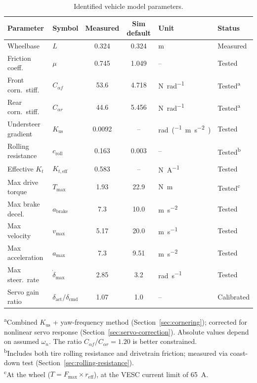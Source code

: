 \documentclass[11pt,a4paper]{article}
\begin{document}
\begin{table}[H]
\centering
\caption{Identified vehicle model parameters.}\label{tab:params}
\begin{tabular}{ll S[table-format=2.3] S[table-format=3.3] l l}
\toprule
{Parameter} & {Symbol} & {Measured} & {Sim default} & {Unit} & {Status} \\
\midrule
Wheelbase             & $L$
  & 0.324  & 0.324  & \si{\metre}
  & Measured \\
Friction coeff.\      & $\mu$
  & 0.745  & 1.049  & {--}
  & Tested \\
Front corn.\ stiff.\  & $C_{\alpha f}$
  & 53.6   & 4.718  & \si{\newton\per\radian}
  & Tested\textsuperscript{a} \\
Rear corn.\ stiff.\   & $C_{\alpha r}$
  & 44.6   & 5.456  & \si{\newton\per\radian}
  & Tested\textsuperscript{a} \\
Understeer gradient   & $K_\text{us}$
  & 0.0092  & {--}   & \si{\radian\per(\metre\per\second\squared)}
  & Tested \\
Rolling resistance   & $c_\text{roll}$
  & 0.163  & 0.003    & {--}
  & Tested\textsuperscript{b} \\
Effective $K_{t}$     & $K_{t,\text{eff}}$
  & 0.583  & {--}   & \si{\newton\per\ampere}
  & Tested \\
Max drive torque      & $T_\text{max}$
  & 1.93   & 22.9   & \si{\newton\metre}
  & Tested\textsuperscript{c} \\
Max brake decel.\     & $a_\text{brake}$
  & 7.3    & 10.0   & \si{\metre\per\second\squared}
  & Tested \\
Max velocity          & $v_\text{max}$
  & 5.17   & 20.0   & \si{\metre\per\second}
  & Tested \\
Max acceleration      & $a_\text{max}$
  & 7.3    & 9.51   & \si{\metre\per\second\squared}
  & Tested \\
Max steer.\ rate      & $\dot{\delta}_\text{max}$
  & 2.85   & 3.2    & \si{\radian\per\second}
  & Tested \\
Servo gain ratio      & $\delta_\text{act}/\delta_\text{cmd}$
  & 1.07   & 1.0    & {--}
  & Calibrated \\
\bottomrule
\end{tabular}

\smallskip
\begin{flushleft}
\footnotesize
\textsuperscript{a}Combined $K_\text{us}$ + yaw-frequency method
(Section~\ref{sec:cornering}); corrected for nonlinear servo response
(Section~\ref{sec:servo-correction}).  Absolute values depend on assumed
$\omega_n$.  The ratio $C_{\alpha f}/C_{\alpha r} = 1.20$ is
better constrained.\\
\textsuperscript{b}Includes both tire rolling resistance and drivetrain
friction; measured via coast-down test
(Section~\ref{sec:rolling-resistance}).\\
\textsuperscript{c}At the wheel ($T = F_\text{max} \times r_\text{eff}$),
at the VESC current limit of \SI{65}{\ampere}.
\end{flushleft}
\end{table}
\end{document}
